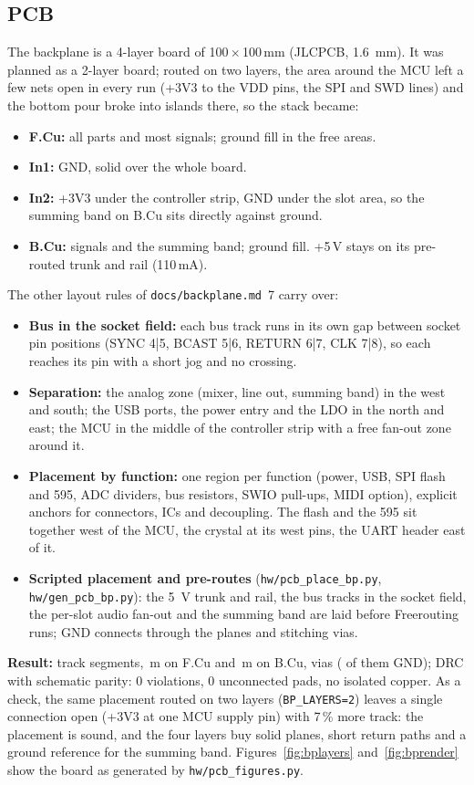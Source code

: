 \documentclass[11pt,a4paper]{article}
\newcommand{\file}[1]{\texttt{#1}}
\begin{document}
\subsection{PCB}
The backplane is a 4-layer board of 100\,$\times$\,100\,mm (JLCPCB, \SI{1.6}{mm}). It was planned as a 2-layer
board; routed on two layers, the area around the MCU left a few nets open in every run (+3V3 to the VDD pins, the
SPI and SWD lines) and the bottom pour broke into islands there, so the stack became:
\begin{itemize}
  \item \textbf{F.Cu:} all parts and most signals; ground fill in the free areas.
  \item \textbf{In1:} GND, solid over the whole board.
  \item \textbf{In2:} +3V3 under the controller strip, GND under the slot area, so the summing band on B.Cu sits
    directly against ground.
  \item \textbf{B.Cu:} signals and the summing band; ground fill. +5\,V stays on its pre-routed trunk and rail
    (110\,mA).
\end{itemize}
The other layout rules of \file{docs/backplane.md}~7 carry over:
\begin{itemize}
  \item \textbf{Bus in the socket field:} each bus track runs in its own gap between socket pin positions (SYNC 4|5,
    BCAST 5|6, RETURN 6|7, CLK 7|8), so each reaches its pin with a short jog and no crossing.
  \item \textbf{Separation:} the analog zone (mixer, line out, summing band) in the west and south; the USB ports, the
    power entry and the LDO in the north and east; the MCU in the middle of the controller strip with a free fan-out
    zone around it.
  \item \textbf{Placement by function:} one region per function (power, USB, SPI flash and 595, ADC dividers, bus
    resistors, SWIO pull-ups, MIDI option), explicit anchors for connectors, ICs and decoupling. The flash and the 595
    sit together west of the MCU, the crystal at its west pins, the UART header east of it.
  \item \textbf{Scripted placement and pre-routes} (\file{hw/pcb\_place\_bp.py}, \file{hw/gen\_pcb\_bp.py}): the
    \SI{5}{V} trunk and rail, the bus tracks in the socket field, the per-slot audio fan-out and the summing band are
    laid before Freerouting runs; GND connects through the planes and stitching vias.
\end{itemize}
\textbf{Result:} \statBpSegments{} track segments, \statBpLenF{}\,m on F.Cu and \statBpLenB{}\,m on B.Cu, \statBpVias{} vias
(\statBpGndVias{} of them GND); DRC with schematic parity: 0 violations, 0 unconnected pads, no isolated copper. As a check, the same placement routed on two layers (\texttt{BP\_LAYERS=2}) leaves a
single connection open (+3V3 at one MCU supply pin) with 7\,\% more track: the placement is sound, and the four
layers buy solid planes, short return paths and a ground reference for the summing band.
Figures~\ref{fig:bplayers} and~\ref{fig:bprender} show the board as generated by \file{hw/pcb\_figures.py}.
\end{document}
